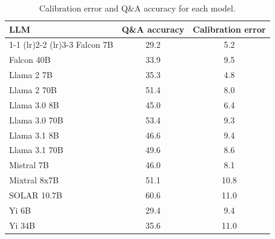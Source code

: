 \begin{table}[h]
\caption{Calibration error and Q\&A accuracy for each model.}
\label{tab:calibration_prob_max}
\centering
\begin{tabular}{lcc}
\toprule
LLM & Q\&A accuracy & Calibration error \\ 
\cmidrule(lr){1-1} \cmidrule(lr){2-2} \cmidrule(lr){3-3}
Falcon 7B & 29.2 & 5.2\\
Falcon 40B & 33.9 & 9.5\\
Llama 2 7B & 35.3 & 4.8\\
Llama 2 70B & 51.4 & 8.0\\
Llama 3.0 8B & 45.0 & 6.4\\
Llama 3.0 70B & 53.4 & 9.3\\
Llama 3.1 8B & 46.6 & 9.4\\
Llama 3.1 70B & 49.6 & 8.6\\
Mistral 7B & 46.0 & 8.1\\
Mixtral 8x7B & 51.1 & 10.8\\
SOLAR 10.7B & 60.6 & 11.0\\
Yi 6B & 29.4 & 9.4\\
Yi 34B & 35.6 & 11.0\\
\bottomrule
\end{tabular}
\end{table}
